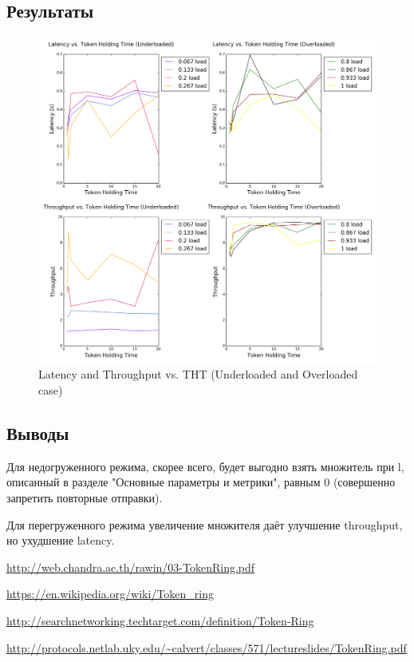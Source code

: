 \documentclass[12pt]{article}
\begin{document}
\subsection{Результаты}

\begin{figure}[H]
\centering
\includegraphics[width=1.1\textwidth]{Plots/THT.png}
\caption{Latency and Throughput vs. THT (Underloaded and Overloaded case)}
\end{figure}

\newpage
\subsection{Выводы}
Для недогруженного режима, скорее всего, будет выгодно взять множитель при l, описанный в разделе "Основные параметры и метрики", равным 0 (совершенно запретить повторные отправки).

Для перегруженного режима увеличение множителя даёт улучшение throughput, но ухудшение latency.

\renewcommand{\refname}{Ссылки} 
\begin{thebibliography}{9}
	  \url{http://web.chandra.ac.th/rawin/03-TokenRing.pdf}
	  
	  \url{https://en.wikipedia.org/wiki/Token_ring}

	  \url{http://searchnetworking.techtarget.com/definition/Token-Ring}
	  
	  \url{http://protocols.netlab.uky.edu/~calvert/classes/571/lectureslides/TokenRing.pdf}
\end{thebibliography} 


% 

% 

% 

% 

% 

% 
\end{document}
